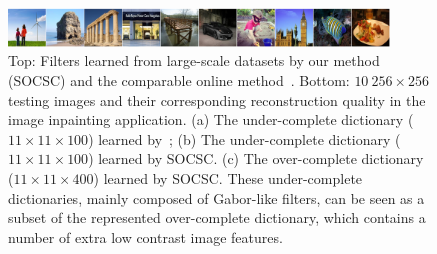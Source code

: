 \begin{figure}[h]
\begin{minipage}{1\textwidth}
\centering
\includegraphics[width=0.9\textwidth]{figure/reconImage.pdf}
\vspace*{2mm}
\end{minipage}
\begin{minipage}{1\textwidth}
    \centering
\end{minipage}
\caption{Top: Filters learned from large-scale datasets by our method (SOCSC) and the comparable online method~\cite{liu-2018-first}. Bottom: $10 ~ 256 \times 256$ testing images and their corresponding reconstruction quality in the image inpainting application. (a) The under-complete dictionary ($11 \times 11 \times 100$) learned by~\cite{liu-2018-first}; (b) The under-complete dictionary ($11 \times 11 \times 100$) learned by SOCSC. (c) The over-complete dictionary ($11 \times 11 \times 400$) learned by SOCSC. These under-complete dictionaries, mainly composed of Gabor-like filters, can be seen as a subset of the represented over-complete dictionary, which contains a number of extra low contrast image features.}
\label{fig:overCompleteDic}
\end{figure}

